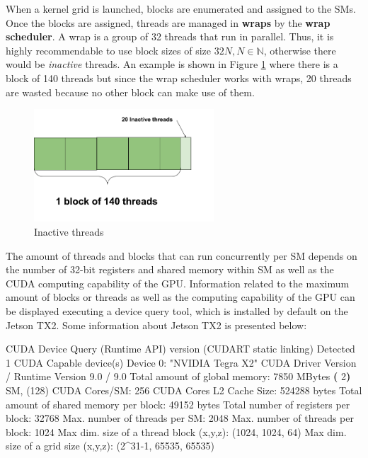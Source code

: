 \documentclass[
  12pt,
  a4paperpaper,
]{report}
\newenvironment{Shaded}{}{}
\newcommand{\BuiltInTok}[1]{#1}
\newcommand{\ExtensionTok}[1]{#1}
\newcommand{\KeywordTok}[1]{\textcolor[rgb]{0.00,0.44,0.13}{\textbf{#1}}}
\newcommand{\NormalTok}[1]{#1}
\newcommand{\StringTok}[1]{\textcolor[rgb]{0.25,0.44,0.63}{#1}}
\begin{document}
When a kernel grid is launched, blocks are enumerated and assigned to the
SMs. Once the blocks are assigned, threads are managed in \textbf{wraps}
by the \textbf{wrap scheduler}. A wrap is a group of 32 threads that
run in parallel. Thus, it is highly recommendable to use block sizes of
size \(32N, N \in \mathbb{N}\), otherwise there would be \textit{inactive}
threads. An example is shown in Figure \ref{img:inactive_thread} where
there is a block of 140 threads but since the wrap scheduler works with
wraps, 20 threads are wasted because no other block can make use of them.

\begin{figure}
\centering
\includegraphics[width=0.6\textwidth,height=\textheight]{source/figures/inactive_thread.png}
\caption{Inactive threads \label{img:inactive_thread}}
\end{figure}

The amount of threads and blocks that can run concurrently per SM
depends on the number of 32-bit registers and shared memory within SM
as well as the CUDA computing capability of the GPU. Information related
to the maximum amount of blocks or threads as well as the computing
capability of the GPU can be displayed executing a device query
tool, which is installed by default on the Jetson TX2. 
Some information about Jetson TX2 is presented below:

\begin{Shaded}
\begin{Highlighting}[]
\ExtensionTok{CUDA}\NormalTok{ Device Query (Runtime API) }\ExtensionTok{version}\NormalTok{ (CUDART static linking)}
\ExtensionTok{Detected}\NormalTok{ 1 CUDA Capable device(s)}
\ExtensionTok{Device}\NormalTok{ 0: }\StringTok{"NVIDIA Tegra X2"}
  \ExtensionTok{CUDA}\NormalTok{ Driver Version / Runtime Version     9.0 / 9.0}
  \ExtensionTok{Total}\NormalTok{ amount of global memory:            7850 MBytes }
  \KeywordTok{(} \ExtensionTok{2}\KeywordTok{)} \ExtensionTok{SM}\NormalTok{, (128) }\ExtensionTok{CUDA}\NormalTok{ Cores/SM:             256 CUDA Cores}
  \ExtensionTok{L2}\NormalTok{ Cache Size:                            524288 bytes}
  \ExtensionTok{Total}\NormalTok{ amount of shared memory per block:  49152 bytes}
  \ExtensionTok{Total}\NormalTok{ number of registers per block:      32768}
  \ExtensionTok{Max.}\NormalTok{ number of threads per SM:            2048}
  \ExtensionTok{Max.}\NormalTok{ number of threads per block:         1024}
  \ExtensionTok{Max}\NormalTok{ dim. size of a thread block (x,y,z)}\BuiltInTok{:}\NormalTok{  (1024, 1024, 64)}
  \ExtensionTok{Max}\NormalTok{ dim. size of a grid size    (x,y,z)}\BuiltInTok{:}\NormalTok{  (2\^{}31{-}1, 65535, 65535)}
\end{Highlighting}
\end{Shaded}
\end{document}
